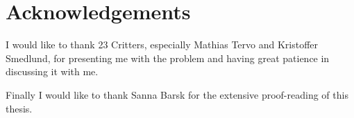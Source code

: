 \chapter{Acknowledgements}

I would like to thank 23 Critters, especially Mathias Tervo and Kristoffer Smedlund, for presenting me with the problem and having great patience in discussing it with me. 


Finally I would like to thank Sanna Barsk for the extensive proof-reading of this thesis. 

